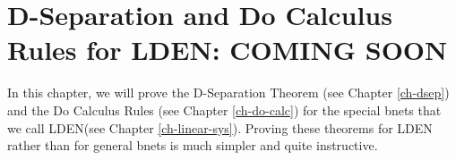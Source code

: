 \chapter{D-Separation and Do Calculus
Rules for LDEN: COMING SOON}
\label{ch-dsep-lden}
In this chapter,
we will prove the D-Separation Theorem
(see Chapter \ref{ch-dsep}) and
the Do Calculus Rules (see Chapter \ref{ch-do-calc})
for the special bnets that we call
LDEN(see Chapter \ref{ch-linear-sys}). Proving these theorems for LDEN
rather than for general bnets
is much simpler and quite
instructive.
